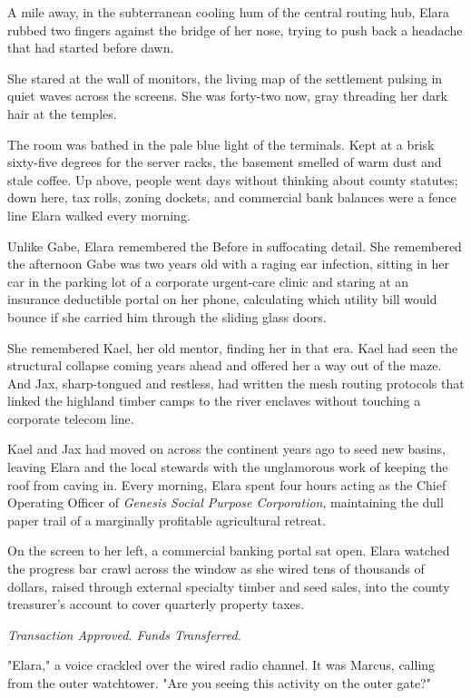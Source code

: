 \bigskip

A mile away, in the subterranean cooling hum of the central routing hub, Elara rubbed two fingers against the bridge of her nose, trying to push back a headache that had started before dawn.

She stared at the wall of monitors, the living map of the settlement pulsing in quiet waves across the screens. She was forty-two now, gray threading her dark hair at the temples.

The room was bathed in the pale blue light of the terminals. Kept at a brisk sixty-five degrees for the server racks, the basement smelled of warm dust and stale coffee. Up above, people went days without thinking about county statutes; down here, tax rolls, zoning dockets, and commercial bank balances were a fence line Elara walked every morning.

Unlike Gabe, Elara remembered the Before in suffocating detail. She remembered the afternoon Gabe was two years old with a raging ear infection, sitting in her car in the parking lot of a corporate urgent-care clinic and staring at an insurance deductible portal on her phone, calculating which utility bill would bounce if she carried him through the sliding glass doors.

She remembered Kael, her old mentor, finding her in that era. Kael had seen the structural collapse coming years ahead and offered her a way out of the maze. And Jax, sharp-tongued and restless, had written the mesh routing protocols that linked the highland timber camps to the river enclaves without touching a corporate telecom line.

Kael and Jax had moved on across the continent years ago to seed new basins, leaving Elara and the local stewards with the unglamorous work of keeping the roof from caving in. Every morning, Elara spent four hours acting as the Chief Operating Officer of \textit{Genesis Social Purpose Corporation}, maintaining the dull paper trail of a marginally profitable agricultural retreat.

On the screen to her left, a commercial banking portal sat open. Elara watched the progress bar crawl across the window as she wired tens of thousands of dollars, raised through external specialty timber and seed sales, into the county treasurer's account to cover quarterly property taxes.

\textit{Transaction Approved. Funds Transferred.}

"Elara," a voice crackled over the wired radio channel. It was Marcus, calling from the outer watchtower. "Are you seeing this activity on the outer gate?"

